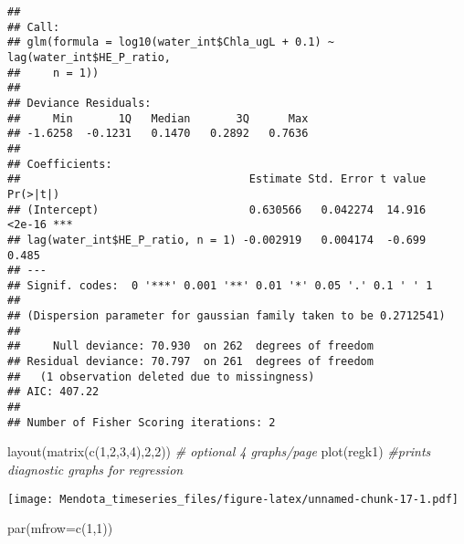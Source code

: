 \documentclass[
]{article}
\newenvironment{Shaded}{\begin{snugshade}}{\end{snugshade}}
\newcommand{\AttributeTok}[1]{\textcolor[rgb]{0.77,0.63,0.00}{#1}}
\newcommand{\CommentTok}[1]{\textcolor[rgb]{0.56,0.35,0.01}{\textit{#1}}}
\newcommand{\DecValTok}[1]{\textcolor[rgb]{0.00,0.00,0.81}{#1}}
\newcommand{\FloatTok}[1]{\textcolor[rgb]{0.00,0.00,0.81}{#1}}
\newcommand{\FunctionTok}[1]{\textcolor[rgb]{0.00,0.00,0.00}{#1}}
\newcommand{\NormalTok}[1]{#1}
\newcommand{\OtherTok}[1]{\textcolor[rgb]{0.56,0.35,0.01}{#1}}
\newcommand{\SpecialCharTok}[1]{\textcolor[rgb]{0.00,0.00,0.00}{#1}}
\begin{document}
\begin{Shaded}
\end{Shaded}

\begin{verbatim}
## 
## Call:
## glm(formula = log10(water_int$Chla_ugL + 0.1) ~ lag(water_int$HE_P_ratio, 
##     n = 1))
## 
## Deviance Residuals: 
##     Min       1Q   Median       3Q      Max  
## -1.6258  -0.1231   0.1470   0.2892   0.7636  
## 
## Coefficients:
##                                   Estimate Std. Error t value Pr(>|t|)    
## (Intercept)                       0.630566   0.042274  14.916   <2e-16 ***
## lag(water_int$HE_P_ratio, n = 1) -0.002919   0.004174  -0.699    0.485    
## ---
## Signif. codes:  0 '***' 0.001 '**' 0.01 '*' 0.05 '.' 0.1 ' ' 1
## 
## (Dispersion parameter for gaussian family taken to be 0.2712541)
## 
##     Null deviance: 70.930  on 262  degrees of freedom
## Residual deviance: 70.797  on 261  degrees of freedom
##   (1 observation deleted due to missingness)
## AIC: 407.22
## 
## Number of Fisher Scoring iterations: 2
\end{verbatim}

\begin{Shaded}
\begin{Highlighting}[]
\FunctionTok{layout}\NormalTok{(}\FunctionTok{matrix}\NormalTok{(}\FunctionTok{c}\NormalTok{(}\DecValTok{1}\NormalTok{,}\DecValTok{2}\NormalTok{,}\DecValTok{3}\NormalTok{,}\DecValTok{4}\NormalTok{),}\DecValTok{2}\NormalTok{,}\DecValTok{2}\NormalTok{)) }\CommentTok{\# optional 4 graphs/page}
\FunctionTok{plot}\NormalTok{(regk1) }\CommentTok{\#prints diagnostic graphs for regression}
\end{Highlighting}
\end{Shaded}

\texttt{[image: Mendota\_timeseries\_files/figure-latex/unnamed-chunk-17-1.pdf]}

\begin{Shaded}
\begin{Highlighting}[]
\FunctionTok{par}\NormalTok{(}\AttributeTok{mfrow=}\FunctionTok{c}\NormalTok{(}\DecValTok{1}\NormalTok{,}\DecValTok{1}\NormalTok{))}
\end{Highlighting}
\end{Shaded}
\end{document}
